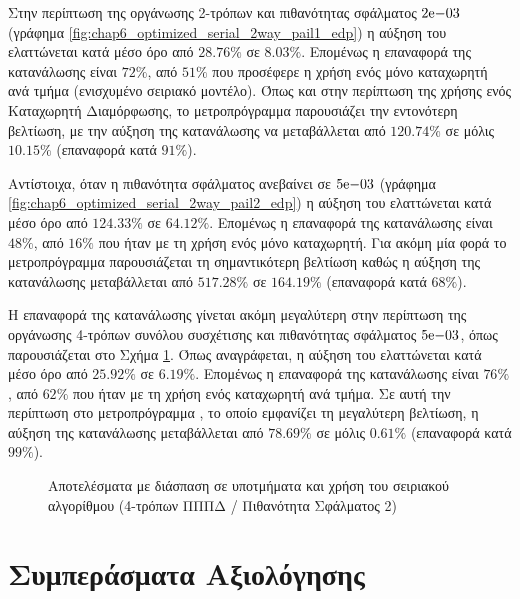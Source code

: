 Στην περίπτωση της οργάνωσης 2-τρόπων και πιθανότητας σφάλματος $2\mathrm{e}{-03}$ (γράφημα \ref{fig:chap6_optimized_serial_2way_pail1_edp}) η αύξηση του \edp ελαττώνεται κατά μέσο όρο από $28.76\%$ σε $8.03\%$. Επομένως η επαναφορά της κατανάλωσης είναι $72\%$, από $51\%$ που προσέφερε η χρήση ενός μόνο καταχωρητή ανά τμήμα (ενισχυμένο σειριακό μοντέλο). Όπως και στην περίπτωση της χρήσης ενός Καταχωρητή Διαμόρφωσης, το μετροπρόγραμμα  παρουσιάζει την εντονότερη βελτίωση, με την αύξηση της κατανάλωσης να μεταβάλλεται από $120.74\%$ σε μόλις $10.15\%$ (επαναφορά κατά $91\%$).
\par
Αντίστοιχα, όταν η πιθανότητα σφάλματος ανεβαίνει σε $5\mathrm{e}{-03}$ (γράφημα \ref{fig:chap6_optimized_serial_2way_pail2_edp}) η αύξηση του \edp ελαττώνεται κατά μέσο όρο από $124.33\%$ σε $64.12\%$. Επομένως η επαναφορά της κατανάλωσης είναι $48\%$, από $16\%$ που ήταν με τη χρήση ενός μόνο καταχωρητή. Για ακόμη μία φορά το μετροπρόγραμμα  παρουσιάζεται τη σημαντικότερη βελτίωση καθώς η αύξηση της κατανάλωσης μεταβάλλεται από $517.28\%$ σε $164.19\%$ (επαναφορά κατά $68\%$).
\par
Η επαναφορά της κατανάλωσης γίνεται ακόμη μεγαλύτερη στην περίπτωση της οργάνωσης 4-τρόπων συνόλου συσχέτισης και πιθανότητας σφάλματος $5\mathrm{e}{-03}$, όπως παρουσιάζεται στο Σχήμα \ref{fig:chap6_optimized_serial_4way_edp}. Όπως αναγράφεται, η αύξηση του \edp ελαττώνεται κατά μέσο όρο από $25.92\%$ σε $6.19\%$. Επομένως η επαναφορά της κατανάλωσης είναι $76\%$, από $62\%$ που ήταν με τη χρήση ενός καταχωρητή ανά τμήμα. Σε αυτή την περίπτωση στο μετροπρόγραμμα , το οποίο εμφανίζει τη μεγαλύτερη βελτίωση, η αύξηση της κατανάλωσης μεταβάλλεται από $78.69\%$ σε μόλις $0.61\%$ (επαναφορά κατά $99\%$).

\begin{figure}[!t]
    \centering
    \caption{Αποτελέσματα με διάσπαση σε υποτμήματα και χρήση του σειριακού αλγορίθμου (4-τρόπων ΠΠΠΔ / Πιθανότητα Σφάλματος 2)}
    \label{fig:chap6_optimized_serial_4way_edp}
\end{figure}


\section{Συμπεράσματα Αξιολόγησης}

